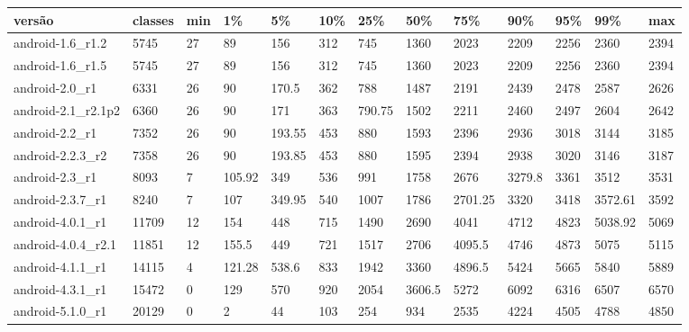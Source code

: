 \begin{tabular}{|l|l|l|l|l|l|l|l|l|l|l|l|l|}
\hline
versão&classes&min&1\%&5\%&10\%&25\%&50\%&75\%&90\%&95\%&99\%&max\\
\hline
android-1.6\_r1.2&5745&27&89&156&312&745&1360&2023&2209&2256&2360&2394\\
\hline
android-1.6\_r1.5&5745&27&89&156&312&745&1360&2023&2209&2256&2360&2394\\
\hline
android-2.0\_r1&6331&26&90&170.5&362&788&1487&2191&2439&2478&2587&2626\\
\hline
android-2.1\_r2.1p2&6360&26&90&171&363&790.75&1502&2211&2460&2497&2604&2642\\
\hline
android-2.2\_r1&7352&26&90&193.55&453&880&1593&2396&2936&3018&3144&3185\\
\hline
android-2.2.3\_r2&7358&26&90&193.85&453&880&1595&2394&2938&3020&3146&3187\\
\hline
android-2.3\_r1&8093&7&105.92&349&536&991&1758&2676&3279.8&3361&3512&3531\\
\hline
android-2.3.7\_r1&8240&7&107&349.95&540&1007&1786&2701.25&3320&3418&3572.61&3592\\
\hline
android-4.0.1\_r1&11709&12&154&448&715&1490&2690&4041&4712&4823&5038.92&5069\\
\hline
android-4.0.4\_r2.1&11851&12&155.5&449&721&1517&2706&4095.5&4746&4873&5075&5115\\
\hline
android-4.1.1\_r1&14115&4&121.28&538.6&833&1942&3360&4896.5&5424&5665&5840&5889\\
\hline
android-4.3.1\_r1&15472&0&129&570&920&2054&3606.5&5272&6092&6316&6507&6570\\
\hline
android-5.1.0\_r1&20129&0&2&44&103&254&934&2535&4224&4505&4788&4850\\
\hline
\end{tabular}
